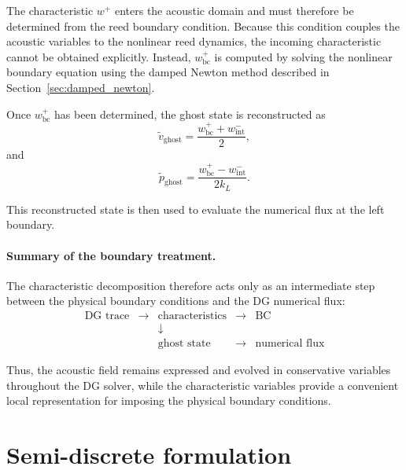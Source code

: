 \documentclass[11pt,a4paper]{report}
\theoremstyle{plain}
\theoremstyle{definition}
\begin{document}
The characteristic $w^+$ enters the acoustic domain and must therefore be
determined from the reed boundary condition. Because this condition couples
the acoustic variables to the nonlinear reed dynamics, the incoming
characteristic cannot be obtained explicitly. Instead,
$w^+_{\mathrm{bc}}$ is computed by solving the nonlinear boundary equation
using the damped Newton method described in
Section~\ref{sec:damped_newton}.

Once $w^+_{\mathrm{bc}}$ has been determined, the ghost state is reconstructed
as
\begin{equation}
\tilde v_{\mathrm{ghost}}
=
\frac{
w^+_{\mathrm{bc}}
+
w^-_{\mathrm{int}}
}{2},
\end{equation}
and
\begin{equation}
\tilde p_{\mathrm{ghost}}
=
\frac{
w^+_{\mathrm{bc}}
-
w^-_{\mathrm{int}}
}{
2k_L
}.
\end{equation}

This reconstructed state is then used to evaluate the numerical flux at the
left boundary.


\paragraph{Summary of the boundary treatment.}

The characteristic decomposition therefore acts only as an intermediate step
between the physical boundary conditions and the DG numerical flux:
\begin{equation}
\boxed{
\begin{array}{ccccc}
\text{DG trace}
& \rightarrow &
\text{characteristics}
& \rightarrow &
\text{BC}
\\[0.5em]
&& \downarrow && \\
&& \text{ghost state}
& \rightarrow &
\text{numerical flux}
\end{array}
}
\end{equation}

Thus, the acoustic field remains expressed and evolved in conservative
variables throughout the DG solver, while the characteristic variables provide
a convenient local representation for imposing the physical boundary
conditions.


\section{Semi-discrete formulation}
\label{sec:semi_discrete_formulation}
\end{document}
